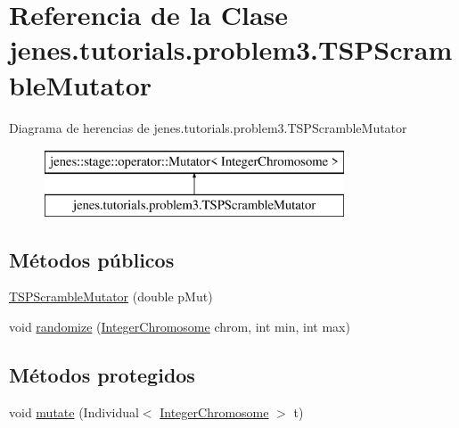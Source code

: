 \hypertarget{classjenes_1_1tutorials_1_1problem3_1_1_t_s_p_scramble_mutator}{\section{Referencia de la Clase jenes.\-tutorials.\-problem3.\-T\-S\-P\-Scramble\-Mutator}
\label{classjenes_1_1tutorials_1_1problem3_1_1_t_s_p_scramble_mutator}
}
Diagrama de herencias de jenes.\-tutorials.\-problem3.\-T\-S\-P\-Scramble\-Mutator\begin{figure}[H]
\begin{center}
\leavevmode
\includegraphics[height=2.000000cm]{classjenes_1_1tutorials_1_1problem3_1_1_t_s_p_scramble_mutator}
\end{center}
\end{figure}
\subsection*{Métodos públicos}
\begin{DoxyCompactItemize}
\item 
\hyperlink{classjenes_1_1tutorials_1_1problem3_1_1_t_s_p_scramble_mutator_a405cbd7c659b7f1053399d0fa9a5b942}{T\-S\-P\-Scramble\-Mutator} (double p\-Mut)
\item 
void \hyperlink{classjenes_1_1tutorials_1_1problem3_1_1_t_s_p_scramble_mutator_a42d01f9f0cd8138659b8e76fdc41cd1e}{randomize} (\hyperlink{classjenes_1_1chromosome_1_1_integer_chromosome}{Integer\-Chromosome} chrom, int min, int max)
\end{DoxyCompactItemize}
\subsection*{Métodos protegidos}
\begin{DoxyCompactItemize}
\item 
void \hyperlink{classjenes_1_1tutorials_1_1problem3_1_1_t_s_p_scramble_mutator_ab355f07bb36d37f05a81eac0cc110b42}{mutate} (Individual$<$ \hyperlink{classjenes_1_1chromosome_1_1_integer_chromosome}{Integer\-Chromosome} $>$ t)
\end{DoxyCompactItemize}


